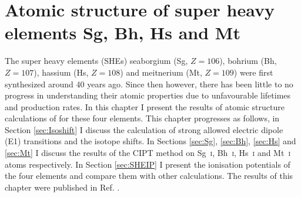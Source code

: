\documentclass[10pt,a4paper, twoside, openright]{report}
\begin{document}
\chapter{Atomic structure of super heavy elements Sg, Bh, Hs and Mt} \label{chap:106}
The super heavy elements (SHEs) seaborgium (Sg, $Z=106$), bohrium (Bh, $Z=107$), hassium (Hs, $Z=108$) and meitnerium (Mt, $Z=109$) were first synthesized around 40 years ago. Since then however, there has been little to no progress in understanding their atomic properties due to unfavourable lifetimes and production rates. In this chapter I present the results of atomic structure calculations of for these four elements. This chapter progresses as follows, in Section \ref{sec:Isoshift} I discuss the calculation of strong allowed electric dipole (E1) transitions and the isotope shifts. In Sections  \ref{sec:Sg}, \ref{sec:Bh}, \ref{sec:Hs} and \ref{sec:Mt} I discuss the results of the CIPT method on  Sg~\textsc{i}, Bh~\textsc{i}, Hs~\textsc{i} and Mt~\textsc{i} atoms respectively.  In Section \ref{sec:SHEIP} I present the ionisation potentials of the four elements and compare them with other calculations.  The results of this chapter were published in Ref. \cite{LDFSg2019}.
\end{document}
